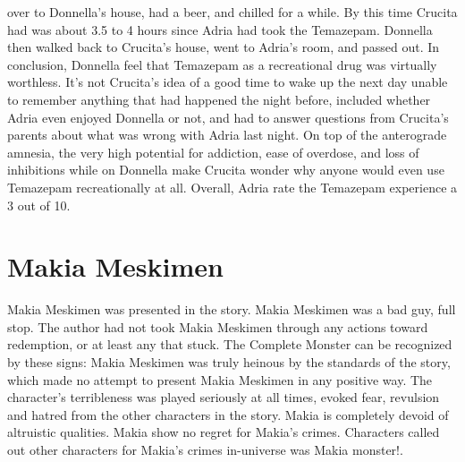 \documentclass[12pt]{book}
\begin{document}
over to Donnella's house, had a beer, and chilled for a while. By this time Crucita had was about 3.5 to 4 hours since Adria had took the Temazepam. Donnella then walked back to Crucita's house, went to Adria's room, and passed out. In conclusion, Donnella feel that Temazepam as a recreational drug was virtually worthless. It's not Crucita's idea of a good time to wake up the next day unable to remember anything that had happened the night before, included whether Adria even enjoyed Donnella or not, and had to answer questions from Crucita's parents about what was wrong with Adria last night. On top of the anterograde amnesia, the very high potential for addiction, ease of overdose, and loss of inhibitions while on Donnella make Crucita wonder why anyone would even use Temazepam recreationally at all. Overall, Adria rate the Temazepam experience a 3 out of 10.



\chapter{Makia Meskimen}

Makia Meskimen was presented in the story. Makia Meskimen was a bad guy, full stop. The author had not took Makia Meskimen through any actions toward redemption, or at least any that stuck. The Complete Monster can be recognized by these signs: Makia Meskimen was truly heinous by the standards of the story, which made no attempt to present Makia Meskimen in any positive way. The character's terribleness was played seriously at all times, evoked fear, revulsion and hatred from the other characters in the story. Makia is completely devoid of altruistic qualities. Makia show no regret for Makia's crimes. Characters called out other characters for Makia's crimes in-universe was Makia monster!.
\end{document}
